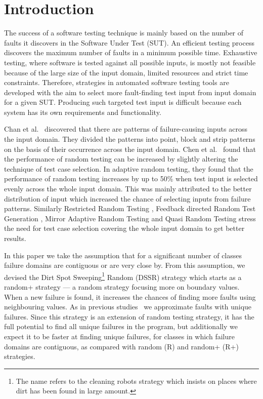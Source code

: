 \documentclass[conference]{IEEEtran}
\begin{document}
\section{Introduction}\label{sec:intro}
The success of a software testing technique is mainly based on the number of faults it discovers in the Software Under Test (SUT). An efficient testing process discovers the maximum number of faults in a minimum possible time. Exhaustive testing, where software is tested against all possible inputs, is mostly not feasible because of the large size of the input domain, limited resources and strict time constraints. Therefore, strategies in automated software testing tools are developed with the aim to select more fault-finding test input from input domain for a given SUT. Producing such targeted test input is difficult because each system has its own requirements and functionality.

Chan et al.~\cite{Chan1996} discovered that there are patterns of failure-causing inputs across the input domain. They divided the patterns into point, block and strip patterns on the basis of their occurrence across the input domain. Chen et al.~\cite{Chen2008} found that the performance of random testing can be increased by slightly altering the technique of test case selection. In adaptive random testing, they found that the performance of random testing increases by up to 50\% when test input is selected evenly across the whole input domain. This was mainly attributed to the better distribution of input which increased the chance of selecting inputs from failure patterns. Similarly Restricted Random Testing \cite{Chan2002}, Feedback directed Random Test Generation \cite{Pacheco2007a}, Mirror Adaptive Random Testing \cite{Chen2003} and Quasi Random Testing \cite{Chen2005} stress the need for test case selection covering the whole input domain to get better results.

In this paper we take the assumption that for a significant number of classes failure domains are contiguous or are very close by. From this assumption, we devised the Dirt Spot Sweeping\footnote{The name refers to the cleaning robots strategy which insists on places where dirt has been found in large amount.} Random (DSSR) strategy  which starts as a random+ strategy --- a random strategy focusing more on boundary values. When a new failure is found, it increases the chances of finding more faults using neighbouring values. As in previous studies~\cite{Oriol2012} we approximate faults with unique failures. Since this strategy is an extension of random testing strategy, it has the full potential to find all unique failures in the program, but additionally we expect it to be faster at finding unique failures, for classes in which failure domains are contiguous, as compared with random (R) and random+ (R+) strategies.
\end{document}
